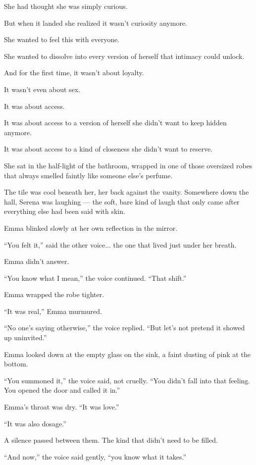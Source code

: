 She had thought she was simply curious.

But when it landed she realized it wasn’t curiosity anymore.

She wanted to feel this with everyone.

She wanted to dissolve into every version of herself that intimacy could unlock.

And for the first time, it wasn’t about loyalty.

It wasn’t even about sex.

It was about access.

It was about access to a version of herself she didn’t want to keep hidden anymore.

It was about access to a kind of closeness she didn’t want to reserve.
  



She sat in the half-light of the bathroom, wrapped in one of those oversized robes that always smelled 
faintly like someone else’s perfume.

The tile was cool beneath her, her back against the vanity. Somewhere down the hall, Serena was 
laughing — the soft, bare kind of laugh that only came after everything else had been said with skin.

Emma blinked slowly at her own reflection in the mirror.

``You felt it,'' said the other voice... the one that lived just under her breath.

Emma didn’t answer.

``You know what I mean,'' the voice continued. ``That shift.''

Emma wrapped the robe tighter.

``It was real,'' Emma murmured. 

``No one’s saying otherwise,'' the voice replied. ``But let’s not pretend it showed up uninvited.''

Emma looked down at the empty glass on the sink, a faint dusting of pink at the bottom.

``You summoned it,'' the voice said, not cruelly. ``You didn’t fall into that feeling. You opened 
the door and called it in.''

Emma’s throat was dry. ``It was love.''

``It was also dosage.''

A silence passed between them. The kind that didn’t need to be filled.

``And now,'' the voice said gently, ``you know what it takes.''

